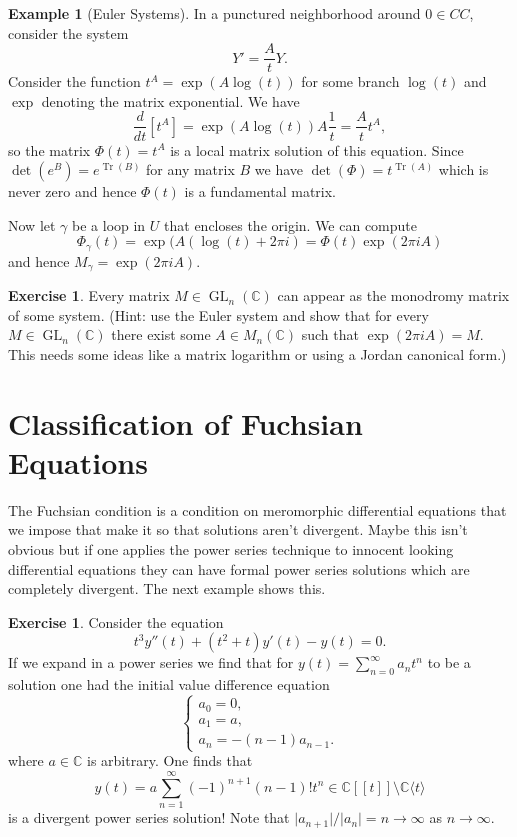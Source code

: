 \documentclass[12pt]{book}
\numberwithin{equation}{section}
\theoremstyle{definition}
\newtheorem{example}[theorem]{Example}
\newtheorem{exercise}[theorem]{Exercise}
\theoremstyle{remark}
\newcommand{\CC}{\mathbb{C}}
\newcommand{\GL}{\operatorname{GL}}
\newcommand{\Tr}{\operatorname{Tr}}
\begin{document}
	\begin{example}[Euler Systems]
	In a punctured neighborhood around $0 \in CC$, consider the system 
	$$ Y' = \frac{A}{t} Y. $$
	Consider the function $t^A = \exp(A \log(t))$ for some branch $\log(t)$ and $\exp$ denoting the matrix exponential. We have 
	$$\dfrac{d}{dt}\left[ t^A\right] = \exp(A \log(t) ) A \frac{1}{t} = \frac{A}{t} t^A,$$
	so the matrix $\Phi(t) = t^A$ is a local matrix solution of this equation. 
	Since $\det(e^B) = e^{\Tr(B)}$ for any matrix $B$ we have $\det(\Phi) = t^{\Tr(A)}$ which is never zero and hence $\Phi(t)$ is a fundamental matrix. 
	
	Now let $\gamma$ be a loop in $U$ that encloses the origin.  
	We can compute 
	 $$\Phi_{\gamma}(t) = \exp( A( \log(t) + 2\pi i) = \Phi(t) \exp(2\pi i A) $$
	and hence $M_{\gamma} = \exp(2\pi i A).$
\end{example}

\begin{exercise}
	Every matrix $M \in \GL_n(\CC)$ can appear as the monodromy matrix of some system. (Hint: use the Euler system and show that for every $M \in \GL_n(\CC)$ there exist some $A \in M_n(\CC)$ such that $\exp(2\pi i A) = M$. This needs some ideas like a matrix logarithm or using a Jordan canonical form.)
\end{exercise}

\section[Fuchsian Condition]{Classification of Fuchsian Equations}
The Fuchsian condition is a condition on meromorphic differential equations that we impose that make it so that solutions aren't divergent. 
Maybe this isn't obvious but if one applies the power series technique to innocent looking differential equations they can have formal power series solutions which are completely divergent. 
The next example shows this.
\begin{exercise}
	Consider the equation 
	 $$ t^3 y''(t) + (t^2+t) y'(t) - y(t) =0.$$
	If we expand in a power series we find that for $ y(t) = \sum_{n=0}^{\infty} a_n t^n $
	to be a solution one had the initial value difference equation
	$$\begin{cases}
	a_0 =0, \\
	a_1 = a, \\
	a_n = -(n-1)a_{n-1}.
	\end{cases}$$
	where $a \in \CC$ is arbitrary. 
	One finds that 
	$$ y(t) = a \sum_{n=1}^{\infty} (-1)^{n+1} (n-1)! t^n \in \CC[[t]]\setminus \CC\langle t \rangle$$
	is a divergent power series solution! Note that $\vert a_{n+1} \vert/\vert a_n \vert = n \to \infty$ as $n\to \infty$.
\end{exercise}	
\end{document}
